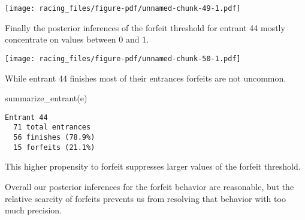 \documentclass[
  letterpaper,
  DIV=11,
  numbers=noendperiod]{scrartcl}
\newenvironment{Shaded}{\begin{snugshade}}{\end{snugshade}}
\newcommand{\AttributeTok}[1]{\textcolor[rgb]{0.40,0.45,0.13}{#1}}
\newcommand{\DecValTok}[1]{\textcolor[rgb]{0.68,0.00,0.00}{#1}}
\newcommand{\FunctionTok}[1]{\textcolor[rgb]{0.28,0.35,0.67}{#1}}
\newcommand{\NormalTok}[1]{\textcolor[rgb]{0.00,0.23,0.31}{#1}}
\newcommand{\OtherTok}[1]{\textcolor[rgb]{0.00,0.23,0.31}{#1}}
\newcommand{\SpecialCharTok}[1]{\textcolor[rgb]{0.37,0.37,0.37}{#1}}
\newcommand{\StringTok}[1]{\textcolor[rgb]{0.13,0.47,0.30}{#1}}
\begin{document}
\texttt{[image: racing\_files/figure-pdf/unnamed-chunk-49-1.pdf]}

Finally the posterior inferences of the forfeit threshold for entrant 44
mostly concentrate on values between \(0\) and \(1\).

\begin{Shaded}
\end{Shaded}

\texttt{[image: racing\_files/figure-pdf/unnamed-chunk-50-1.pdf]}

While entrant 44 finishes most of their entrances forfeits are not
uncommon.

\begin{Shaded}
\begin{Highlighting}[]
\FunctionTok{summarize\_entrant}\NormalTok{(e)}
\end{Highlighting}
\end{Shaded}

\begin{verbatim}
Entrant 44
  71 total entrances
  56 finishes (78.9%)
  15 forfeits (21.1%)
\end{verbatim}

This higher propensity to forfeit suppresses larger values of the
forfeit threshold.

Overall our posterior inferences for the forfeit behavior are
reasonable, but the relative scarcity of forfeits prevents us from
resolving that behavior with too much precision.
\end{document}
